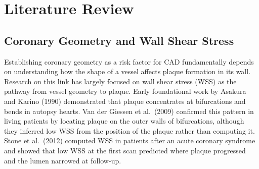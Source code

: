 
\chapter{Literature Review}
\label{ch:literature}

\section{Coronary Geometry and Wall Shear Stress}
\label{sec:lit-wss}

Establishing coronary geometry as a risk factor for CAD fundamentally depends on understanding how
the shape of a vessel affects plaque formation in its wall.
Research on this link has largely focused on wall shear stress (WSS) as the pathway from vessel
geometry to plaque.
Early foundational work by Asakura and Karino (1990) \cite{asakura1990flow} demonstrated that
plaque concentrates at bifurcations and bends in autopsy hearts.
Van der Giessen et al.\ (2009) \cite{vandergiessen2009bifurcation} confirmed this pattern in living
patients by locating plaque on the outer walls of bifurcations, although they inferred low WSS from
the position of the plaque rather than computing it.
Stone et al.\ (2012) \cite{stone2012prediction} computed WSS in patients after an acute coronary
syndrome and showed that low WSS at the first scan predicted where plaque progressed and the lumen
narrowed at follow-up.


